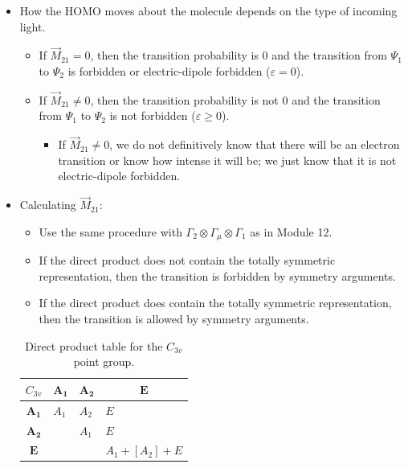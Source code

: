 \documentclass[../notes.tex]{subfiles}
\begin{document}
\begin{itemize}
    \item How the HOMO moves about the molecule depends on the type of incoming light.
    \begin{itemize}
        \item If $\vec{M}_{21}=0$, then the transition probability is 0 and the transition from $\Psi_1$ to $\Psi_2$ is forbidden or electric-dipole forbidden ($\varepsilon=0$).
        \item If $\vec{M}_{21}\neq 0$, then the transition probability is not 0 and the transition from $\Psi_1$ to $\Psi_2$ is not forbidden ($\varepsilon\geq 0$).
        \begin{itemize}
            \item If $\vec{M}_{21}\neq 0$, we do not definitively know that there will be an electron transition or know how intense it will be; we just know that it is not electric-dipole forbidden.
        \end{itemize}
    \end{itemize}
    \item Calculating $\vec{M}_{21}$:
    \begin{itemize}
        \item Use the same procedure with $\Gamma_2\otimes\Gamma_\mu\otimes\Gamma_1$ as in Module 12.
        \item If the direct product does not contain the totally symmetric representation, then the transition is forbidden by symmetry arguments.
        \item If the direct product does contain the totally symmetric representation, then the transition is allowed by symmetry arguments.
    \end{itemize}
    \begin{table}[h!]
        \centering
        \small
        \renewcommand{\arraystretch}{1.4}
        \begin{tabular}{|c|lll|}
            \hline
            \normalsize$C_{3v}$ & $\bm{A_1}$ & $\bm{A_2}$ & \multicolumn{1}{c|}{$\bm{E}$}\\
            \hline
            $\bm{A_1}$ & $A_1$ & $A_2$ & $E$\\
            $\bm{A_2}$ &       & $A_1$ & $E$\\
            $\bm{E}$   &       &       & $A_1+[A_2]+E$\\
            \hline
        \end{tabular}
        \caption{Direct product table for the $C_{3v}$ point group.}
        \label{tab:directProductTable-C3v}
    \end{table}

\end{itemize}
\end{document}
